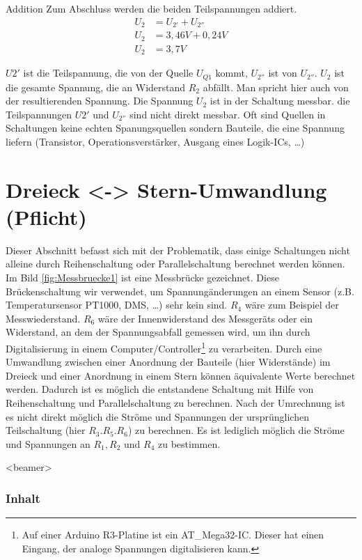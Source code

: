 \documentclass[aspectratio=169, ignorenonframetext]{beamer}
\begin{document}
\begin{frame}{Addition}
  Zum Abschluss werden die beiden Teilspannungen addiert.
  \begin{align}
    U_2 &= U_{2'} + U_{2''}\\
    U_2 &= 3,46V + 0,24V\\
    U_2 &= 3,7V
  \end{align}
\end{frame}
$U{2'}$ ist die Teilspannung, die von der Quelle $U_{Q1}$ kommt, $U_{2''}$ ist von $U_{2''}$. $U_2$ ist die gesamte  Spannung, die an Widerstand $R_2$ abfällt. Man spricht hier auch von der resultierenden Spannung. Die Spannung $U_2$ ist in der Schaltung messbar. die Teilspannungen $U{2'}$ und $U_{2''}$ sind nicht direkt messbar. Oft sind Quellen in Schaltungen keine echten Spanungsquellen sondern Bauteile, die eine Spannung liefern (Transistor, Operationsverstärker, Ausgang eines Logik-ICs, \dots)

\section[Dreieck <-> Stern]{Dreieck <-> Stern-Umwandlung (Pflicht)}
Dieser Abschnitt befasst sich mit der Problematik, dass einige Schaltungen nicht alleine durch Reihenschaltung oder Parallelschaltung berechnet werden können. Im Bild \ref{fig:Messbruecke1} ist eine Messbrücke gezeichnet. Diese Brückenschaltung wir verwendet, um Spannungänderungen an einem Sensor (z.B. Temperatursensor PT1000, DMS, \dots ) sehr kein sind. $R_4$ wäre zum Beispiel der Messwiederstand. $R_6$ wäre der Innenwiderstand des Messgeräts oder ein Widerstand, an dem der Spannungsabfall gemessen wird, um ihn durch Digitalisierung in einem Computer/Controller\footnote{Auf einer Arduino R3-Platine ist ein AT\_Mega32-IC. Dieser hat einen Eingang, der analoge Spannungen digitalisieren kann.} zu verarbeiten. Durch eine Umwandlung zwischen einer Anordnung der Bauteile (hier Widerstände) im Dreieck und einer Anordnung in einem Stern können äquivalente Werte berechnet werden. Dadurch ist es möglich die entstandene Schaltung mit Hilfe von Reihenschaltung und Parallelschaltung zu berechnen. Nach der Umrechnung ist es nicht direkt möglich die Ströme und Spannungen der ursprünglichen Teilschaltung (hier $R_3. R_5. R_6$) zu berechnen. Es ist lediglich möglich die Ströme und Spannungen an $R_1, R_2$ und $R_4$ zu bestimmen.

\begin{frame}<beamer>
  \frametitle{Inhalt}
\end{frame}
\end{document}
